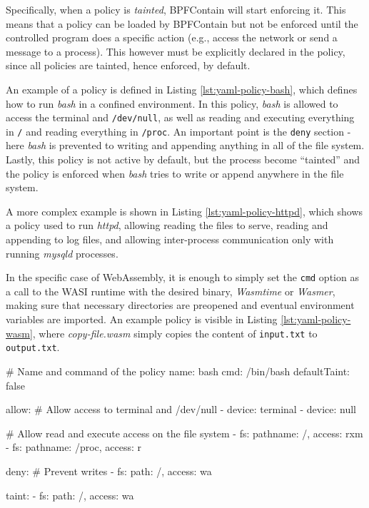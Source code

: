 Specifically, when a policy is \textit{tainted}, BPFContain will start enforcing it. This means that a policy
can be loaded by BPFContain but not be enforced until the controlled program does a specific
action (e.g., access the network or send a message to a process).
This however must be explicitly declared in the policy, since all policies are tainted, hence enforced, by default.

An example of a policy is defined in Listing \ref{lst:yaml-policy-bash}, which defines how to
run \textit{bash} in a confined environment.
In this policy, \textit{bash} is allowed to access the terminal and \texttt{/dev/null}, as well
as reading and executing everything in \texttt{/} and reading everything in \texttt{/proc}.
An important point is the \texttt{deny} section - here \textit{bash} is prevented to writing and
appending anything in all of the file system.
Lastly, this policy is not active by default, but the process become ``tainted'' and the policy is enforced
when \textit{bash} tries to write or append anywhere in the file system.

A more complex example is shown in Listing \ref{lst:yaml-policy-httpd}, which shows a policy
used to run \textit{httpd}, allowing reading the files to serve, reading and appending to log files,
and allowing inter-process communication only with running \textit{mysqld} processes.

In the specific case of WebAssembly, it is enough to simply set the \texttt{cmd} option as
a call to the WASI runtime with the desired binary, \textit{Wasmtime} or \textit{Wasmer}, making sure that
necessary directories are preopened and eventual environment variables are imported.
An example policy is visible in Listing \ref{lst:yaml-policy-wasm}, where \textit{copy-file.wasm} simply copies
the content of \texttt{input.txt} to \texttt{output.txt}.

\begin{code}[language=yaml, caption=A policy for running bash., label=lst:yaml-policy-bash]
# Name and command of the policy
name: bash
cmd: /bin/bash
defaultTaint: false

allow:
  # Allow access to terminal and /dev/null
  - device: terminal
  - device: null
  
  # Allow read and execute access on the file system
  - fs: {pathname: /, access: rxm}
  - fs: {pathname: /proc, access: r}

deny:
  # Prevent writes
  - fs: {path: /, access: wa}

  taint:
  - fs: {path: /, access: wa}
\end{code}

